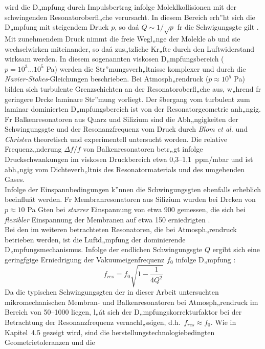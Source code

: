 wird die D„mpfung durch
Impulsbertrag infolge Moleklkollisionen mit der schwingenden
Resonatoroberfl„che verursacht. In diesem Bereich erh”ht sich die D„mpfung
mit steigendem Druck $p$, so daá $Q \sim 1/\sqrt{p}$ fr die Schwigungsgte
gilt \cite{Blo92}. Mit zunehmendem Druck nimmt die freie Wegl„nge der
Molekle ab und sie wechselwirken miteinander, so daá zus„tzliche Kr„fte
durch den Luftwiderstand wirksam werden. In diesem sogenannten viskosen
D„mpfungsbereich ($p=10^3...10^5$ Pa) werden die Str”mungsverh„ltnisse
komplexer und durch die {\sl Navier-Stokes}-Gleichungen beschrieben. Bei
Atmosph„rendruck ($p \approx 10^5$ Pa) bilden sich turbulente
Grenzschichten an der Resonatoroberfl„che aus, w„hrend fr geringere Drcke
laminare Str”mung vorliegt. Der šbergang vom turbulent zum laminar
dominierten D„mpfungsbereich ist von der Resonatorgeometrie anh„ngig.
Fr Balkenresonatoren aus Quarz und Silizium sind die Abh„ngigkeiten
der Schwingungsgte und der Resonanzfrequenz vom Druck durch
{\sl Blom et al.} \cite{Blo92} und {\sl Christen} \cite{Chr83}
theoretisch und experimentell untersucht worden. Die relative
Frequenz„nderung $\Delta f / f$ von Balkenresonatoren betr„gt infolge
Druckschwankungen im viskosen Druckbereich etwa 0,3--1,1~ppm/mbar
\cite{Bus94, Chr83} und ist abh„ngig vom Dichteverh„ltnis des
Resonatormaterials und des umgebenden Gases.\\
Infolge der Einspannbedingungen k”nnen die Schwingungsgten ebenfalls
erheblich beeinfluát werden. Fr Membranresonatoren aus Silizium wurden
bei Drcken von $p \approx 10$ Pa Gten bei {\em starrer} Einspannung von
etwa 900 gemessen, die sich bei {\em flexibler} Einspannung der Membranen
auf etwa 150 erniedrigten \cite{Pra91}.\\
Bei den im weiteren betrachteten Resonatoren, die bei Atmosph„rendruck
betrieben werden, ist die Luftd„mpfung der dominierende D„mpfungsmechanismus.
Infolge der endlichen Schwingungsgte $Q$ ergibt sich eine geringfgige
Erniedrigung der Vakuumeigenfrequenz $f_{0}$ infolge D„mpfung \cite{Pet79}:
\begin{equation}
\label{qpetersen}
 f_{res} = f_{0} \sqrt{1 - \frac{1}{4Q^{2}} }
\end{equation}
Da die typischen Schwingungsgten der in dieser Arbeit untersuchten
mikromechanischen Membran- und Balkenresonatoren bei Atmosph„rendruck
im Bereich von 50--1000 liegen, l„át sich der D„mpfungskorrekturfaktor
bei der Betrachtung der Resonanzfrequenz vernachl„ssigen, d.h.\
$f_{res} \approx f_{0}$.  Wie in Kapitel~4.5 gezeigt wird,
sind die herstellungstechnologiebedingten Geometrietoleranzen und die
